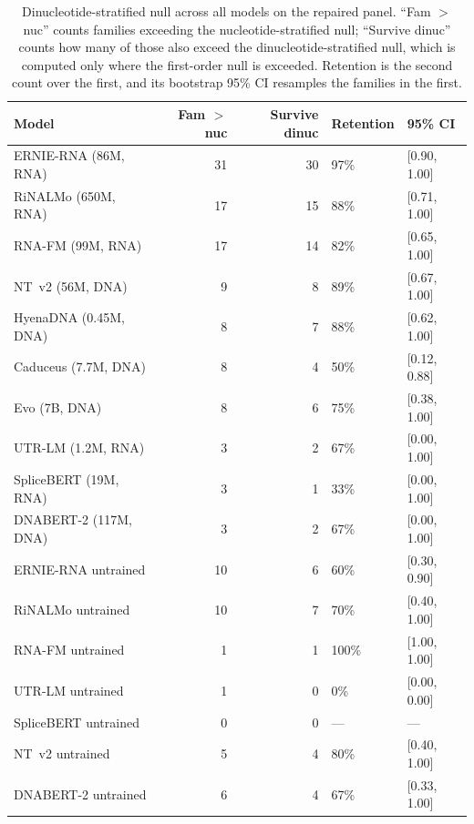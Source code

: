 \begin{table}[htbp]
\centering
\caption{Dinucleotide-stratified null across all models on the repaired panel.
``Fam $>$ nuc'' counts families exceeding the nucleotide-stratified null;
``Survive dinuc'' counts how many of those also exceed the
dinucleotide-stratified null, which is computed only where the first-order null
is exceeded. Retention is the second count over the first, and its bootstrap
95\% CI resamples the families in the first.}
\label{tab:rung2}
\small
\begin{tabular}{lrrll}
\toprule
\textbf{Model} & \textbf{Fam $>$ nuc} & \textbf{Survive dinuc} & \textbf{Retention} & \textbf{95\% CI} \\
\midrule
ERNIE-RNA (86M, RNA)       & 31 & 30 & 97\% & [0.90, 1.00] \\
RiNALMo (650M, RNA)        & 17 & 15 & 88\% & [0.71, 1.00] \\
RNA-FM (99M, RNA)          & 17 & 14 & 82\% & [0.65, 1.00] \\
NT~v2 (56M, DNA)           & 9 & 8 & 89\% & [0.67, 1.00] \\
HyenaDNA (0.45M, DNA)      & 8 & 7 & 88\% & [0.62, 1.00] \\
Caduceus (7.7M, DNA)       & 8 & 4 & 50\% & [0.12, 0.88] \\
Evo (7B, DNA)              & 8 & 6 & 75\% & [0.38, 1.00] \\
UTR-LM (1.2M, RNA)         & 3 & 2 & 67\% & [0.00, 1.00] \\
SpliceBERT (19M, RNA)      & 3 & 1 & 33\% & [0.00, 1.00] \\
DNABERT-2 (117M, DNA)      & 3 & 2 & 67\% & [0.00, 1.00] \\
\midrule
ERNIE-RNA untrained        & 10 & 6 & 60\% & [0.30, 0.90] \\
RiNALMo untrained          & 10 & 7 & 70\% & [0.40, 1.00] \\
RNA-FM untrained           & 1 & 1 & 100\% & [1.00, 1.00] \\
UTR-LM untrained           & 1 & 0 & 0\% & [0.00, 0.00] \\
SpliceBERT untrained       & 0 & 0 & --- & --- \\
NT~v2 untrained            & 5 & 4 & 80\% & [0.40, 1.00] \\
DNABERT-2 untrained        & 6 & 4 & 67\% & [0.33, 1.00] \\
\bottomrule
\end{tabular}
\end{table}

